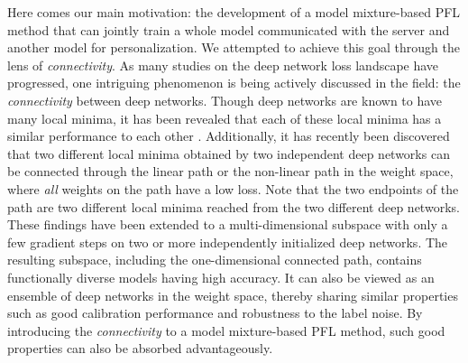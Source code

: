 \documentclass[sigconf]{acmart}
\begin{document}
Here comes our main motivation: the development of a model mixture-based PFL method that can jointly train a whole model communicated with the server and another model for personalization. We attempted to achieve this goal through the lens of \textit{connectivity}. As many studies on the deep network loss landscape have progressed, one intriguing phenomenon is being actively discussed in the field: the \textit{connectivity} \cite{garipov+18, fort2019deep, fort2019large, draxler18, modeconnect, nnsubspaces} between deep networks. Though deep networks are known to have many local minima, it has been revealed that each of these local minima has a similar performance to each other \cite{choro}. Additionally, it has recently been discovered that two different local minima obtained by two independent deep networks can be connected through the linear path \cite{frankle20} or the non-linear path \cite{garipov+18, draxler18} in the weight space, where \textit{all} weights on the path have a low loss. Note that the two endpoints of the path are two different local minima reached from the two different deep networks. These findings have been extended to a multi-dimensional subspace \cite{nnsubspaces, benton21} with only a few gradient steps on two or more independently initialized deep networks. The resulting subspace, including the one-dimensional connected path, contains functionally diverse models having high accuracy. It can also be viewed as an ensemble of deep networks in the weight space, thereby sharing similar properties such as good calibration performance and robustness to the label noise. By introducing the \textit{connectivity} to a model mixture-based PFL method, such good properties can also be absorbed advantageously.
\end{document}
